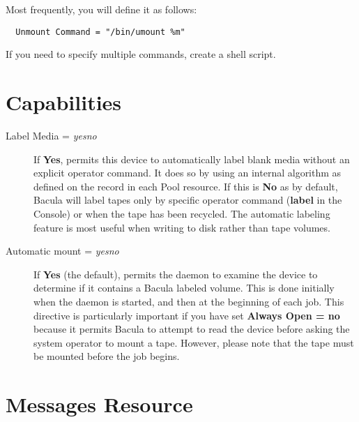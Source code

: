 \begin{description}
   Most frequently, you will define it as follows:  

\footnotesize
\begin{verbatim}
  Unmount Command = "/bin/umount %m"
\end{verbatim}
\normalsize

  If you need to specify multiple commands, create a shell script.

\end{description}

\label{AutochangerRes}
\label{AutochangerResource1}


\section{Capabilities}

\begin{description}

\item [Label Media = {\it yes\vb{}no}]
   If {\bf Yes}, permits this device to automatically label blank media
   without an explicit operator command.  It does so by using an internal
   algorithm as defined on the  record in each
   Pool resource.  If this is {\bf No} as by default, Bacula will label
   tapes only by specific operator command ({\bf label} in the Console) or
   when the tape has been recycled.  The automatic labeling feature is most
   useful when writing to disk rather than tape volumes.

\item [Automatic mount = {\it yes\vb{}no}]
   If {\bf Yes} (the default), permits the daemon to examine the device to
   determine if it contains a Bacula labeled volume.  This is done
   initially when the daemon is started, and then at the beginning of each
   job.  This directive is particularly important if you have set
   {\bf Always Open = no} because it permits Bacula to attempt to read the
   device before asking the system operator to mount a tape.  However,
   please note that the tape must be mounted before the job begins.

\end{description}

\section{Messages Resource}
\label{MessagesResource1}

